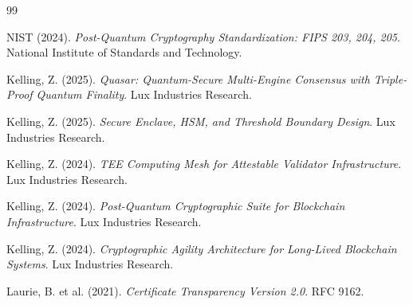 \documentclass[11pt]{article}
\begin{document}
\begin{thebibliography}{99}

NIST (2024).
\textit{Post-Quantum Cryptography Standardization: FIPS 203, 204, 205}.
National Institute of Standards and Technology.

Kelling, Z. (2025).
\textit{Quasar: Quantum-Secure Multi-Engine Consensus with Triple-Proof Quantum Finality}.
Lux Industries Research.

Kelling, Z. (2025).
\textit{Secure Enclave, HSM, and Threshold Boundary Design}.
Lux Industries Research.

Kelling, Z. (2024).
\textit{TEE Computing Mesh for Attestable Validator Infrastructure}.
Lux Industries Research.

Kelling, Z. (2024).
\textit{Post-Quantum Cryptographic Suite for Blockchain Infrastructure}.
Lux Industries Research.

Kelling, Z. (2024).
\textit{Cryptographic Agility Architecture for Long-Lived Blockchain Systems}.
Lux Industries Research.

Laurie, B. et al. (2021).
\textit{Certificate Transparency Version 2.0}.
RFC 9162.

\end{thebibliography}
\end{document}
